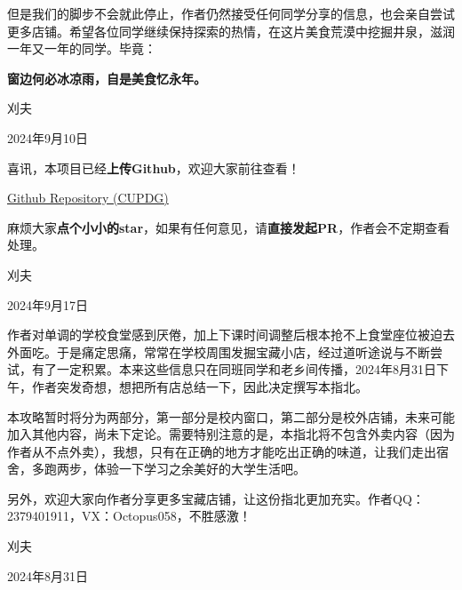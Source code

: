 \documentclass{ctexart}
\newcommand{\xw}[1]{{\CJKfamily{xw}#1}}
\begin{document}
但是我们的脚步不会就此停止，作者仍然接受任何同学分享的信息，也会亲自尝试更多店铺。希望各位同学继续保持探索的热情，在这片美食荒漠中挖掘井泉，滋润一年又一年的同学。毕竟：

\textbf{窗边何必冰凉雨，自是美食忆永年。}
\vspace{16.8pt}
\begin{flushright}
	\xw{刈夫}
	
	2024年9月10日
\end{flushright}

\vspace*{33.6pt}
喜讯，本项目已经\textbf{上传Github}，欢迎大家前往查看！

\href{https://github.com/Octopus058/China-University-of-Petroleum-Dining-Guide}{Github Repository (CUPDG)}

麻烦大家\textbf{点个小小的star}，如果有任何意见，请\textbf{直接发起PR}，作者会不定期查看处理。
\begin{flushright}
	\xw{刈夫}
	
	2024年9月17日
\end{flushright}
\newpage

\noindent{}
\setlength{\parindent}{2em} %

作者对单调的学校食堂感到厌倦，加上下课时间调整后根本抢不上食堂座位被迫去外面吃。于是痛定思痛，常常在学校周围发掘宝藏小店，经过道听途说与不断尝试，有了一定积累。本来这些信息只在同班同学和老乡间传播，2024年8月31日下午，作者突发奇想，想把所有店总结一下，因此决定撰写本指北。

本攻略暂时将分为两部分，第一部分是校内窗口，第二部分是校外店铺，未来可能加入其他内容，尚未下定论。需要特别注意的是，本指北将不包含外卖内容（因为作者从不点外卖），我想，只有在正确的地方才能吃出正确的味道，让我们走出宿舍，多跑两步，体验一下学习之余美好的大学生活吧。

另外，欢迎大家向作者分享更多宝藏店铺，让这份指北更加充实。作者QQ：2379401911，VX：Octopus058，不胜感激！
\vspace{16.8pt}
\begin{flushright}
	\xw{刈夫}
	
	2024年8月31日
\end{flushright}
\end{document}
